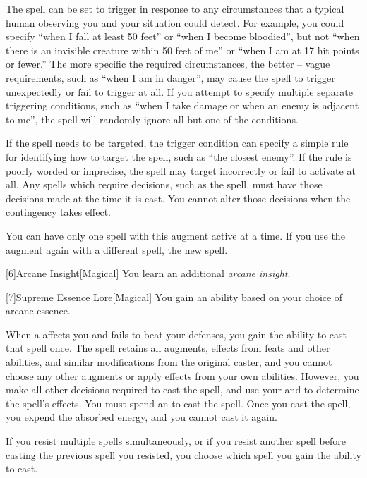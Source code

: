         The spell can be set to trigger in response to any circumstances that a typical human observing you and your situation could detect.
        For example, you could specify ``when I fall at least 50 feet'' or ``when I become bloodied'', but not ``when there is an invisible creature within 50 feet of me'' or ``when I am at 17 hit points or fewer.''
        The more specific the required circumstances, the better -- vague requirements, such as ``when I am in danger'', may cause the spell to trigger unexpectedly or fail to trigger at all.
        If you attempt to specify multiple separate triggering conditions, such as ``when I take damage or when an enemy is adjacent to me'', the spell will randomly ignore all but one of the conditions.

        If the spell needs to be targeted, the trigger condition can specify a simple rule for identifying how to target the spell, such as ``the closest enemy''.
        If the rule is poorly worded or imprecise, the spell may target incorrectly or fail to activate at all.
        Any spells which require decisions, such as the  spell, must have those decisions made at the time it is cast.
        You cannot alter those decisions when the contingency takes effect.

        You can have only one spell with this augment active at a time.
        If you use the augment again with a different spell, the new spell.

        [6]{Arcane Insight}[Magical]
        You learn an additional \textit{arcane insight}.

        [7]{Supreme Essence Lore}[Magical]
        You gain an ability based on your choice of arcane essence.

         When a  affects you and fails to beat your defenses, you gain the ability to cast that spell once.
        The spell retains all augments, effects from feats and other abilities, and similar modifications from the original caster, and you cannot choose any other augments or apply effects from your own abilities.
        However, you make all other decisions required to cast the spell, and use your  and  to determine the spell's effects.
        You must spend an  to cast the spell.
        Once you cast the spell, you expend the absorbed energy, and you cannot cast it again.

        If you resist multiple spells simultaneously, or if you resist another spell before casting the previous spell you resisted, you choose which spell you gain the ability to cast.

